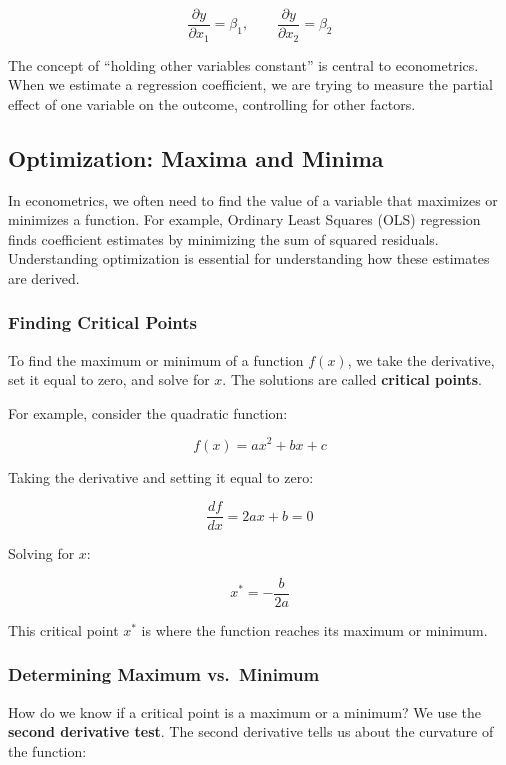 \documentclass[
  letterpaper,
  DIV=11,
  numbers=noendperiod]{scrreprt}
\begin{document}
\[
\frac{\partial y}{\partial x_1} = \beta_1, \qquad \frac{\partial y}{\partial x_2} = \beta_2
\]

The concept of ``holding other variables constant'' is central to
econometrics. When we estimate a regression coefficient, we are trying
to measure the partial effect of one variable on the outcome,
controlling for other factors.

\subsection{Optimization: Maxima and
Minima}\label{optimization-maxima-and-minima}

In econometrics, we often need to find the value of a variable that
maximizes or minimizes a function. For example, Ordinary Least Squares
(OLS) regression finds coefficient estimates by minimizing the sum of
squared residuals. Understanding optimization is essential for
understanding how these estimates are derived.

\subsubsection{Finding Critical Points}\label{finding-critical-points}

To find the maximum or minimum of a function \(f(x)\), we take the
derivative, set it equal to zero, and solve for \(x\). The solutions are
called \textbf{critical points}.

For example, consider the quadratic function:

\[
f(x) = ax^2 + bx + c
\]

Taking the derivative and setting it equal to zero:

\[
\frac{df}{dx} = 2ax + b = 0
\]

Solving for \(x\):

\[
x^* = -\frac{b}{2a}
\]

This critical point \(x^*\) is where the function reaches its maximum or
minimum.

\subsubsection{Determining Maximum
vs.~Minimum}\label{determining-maximum-vs.-minimum}

How do we know if a critical point is a maximum or a minimum? We use the
\textbf{second derivative test}. The second derivative tells us about
the curvature of the function:
\end{document}

